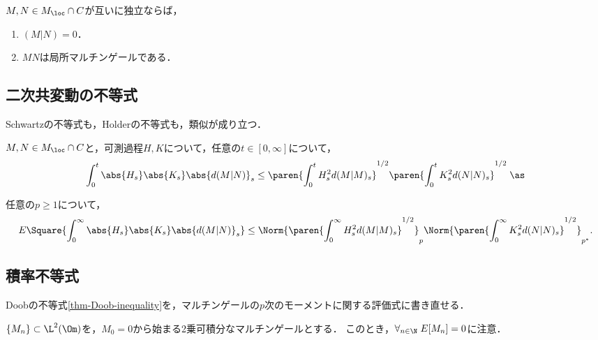 \documentclass[uplatex,dvipdfmx]{jsreport}
\begin{document}
\begin{proposition}[独立性と二次共変動]
    $M,N\in M_\loc\cap C$が互いに独立ならば，
    \begin{enumerate}
        \item $(M|N)=0$．
        \item $MN$は局所マルチンゲールである．
    \end{enumerate}
\end{proposition}

\subsection{二次共変動の不等式}

\begin{tcolorbox}[colframe=ForestGreen, colback=ForestGreen!10!white,breakable,colbacktitle=ForestGreen!40!white,coltitle=black,fonttitle=\bfseries\sffamily,
title=]
    Schwartzの不等式も，Holderの不等式も，類似が成り立つ．
\end{tcolorbox}

\begin{proposition}
    $M,N\in M_\loc\cap C$と，可測過程$H,K$について，任意の$t\in[0,\infty]$について，
    \[\int^t_0\abs{H_s}\abs{K_s}\abs{d(M|N)}_s\le\paren{\int^t_0H_s^2d(M|M)_s}^{1/2}\paren{\int^t_0K_s^2d(N|N)_s}^{1/2}\;\as\]
\end{proposition}

\begin{corollary}
    任意の$p\ge1$について，
    \[E\Square{\int^\infty_0\abs{H_s}\abs{K_s}\abs{d(M|N)}_s}\le\Norm{\paren{\int^\infty_0H_s^2d(M|M)_s}^{1/2}}_p\Norm{\paren{\int^\infty_0K_s^2d(N|N)_s}^{1/2}}_{p^*}.\]
\end{corollary}

\subsection{積率不等式}

\begin{tcolorbox}[colframe=ForestGreen, colback=ForestGreen!10!white,breakable,colbacktitle=ForestGreen!40!white,coltitle=black,fonttitle=\bfseries\sffamily,
title=]
    Doobの不等式\ref{thm-Doob-inequality}を，マルチンゲールの$p$次のモーメントに関する評価式に書き直せる．
\end{tcolorbox}

\begin{notation}
    $\{M_n\}\subset\L^2(\Om)$を，$M_0=0$から始まる2乗可積分なマルチンゲールとする．
    このとき，$\forall_{n\in\N}\;E[M_n]=0$に注意．
\end{notation}
\end{document}
